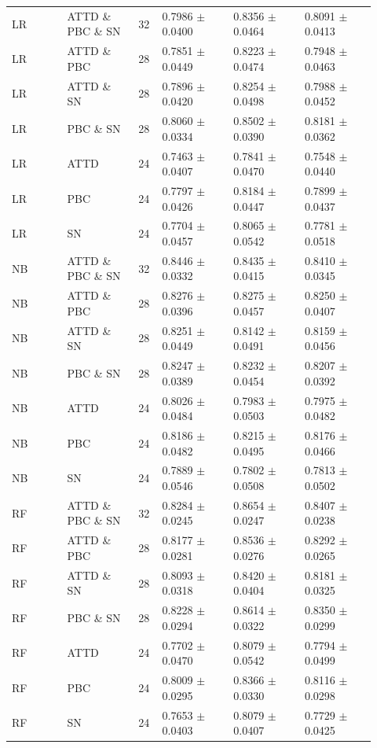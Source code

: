 \documentclass[10pt,a4paper]{article}
\newcommand{\classifiersep}{\addlinespace[1pt]\midrule\addlinespace[1pt]}
\begin{document}
\begin{landscape}
\begin{longtable}{@{}L{0.14\linewidth}L{0.18\linewidth}C{0.06\linewidth}C{0.18\linewidth}C{0.18\linewidth}C{0.18\linewidth}@{}}
LR & ATTD \& PBC \& SN & 32 & 0.7986 $\pm$ 0.0400 & 0.8356 $\pm$ 0.0464 & 0.8091 $\pm$ 0.0413 \\
LR & ATTD \& PBC & 28 & 0.7851 $\pm$ 0.0449 & 0.8223 $\pm$ 0.0474 & 0.7948 $\pm$ 0.0463 \\
LR & ATTD \& SN & 28 & 0.7896 $\pm$ 0.0420 & 0.8254 $\pm$ 0.0498 & 0.7988 $\pm$ 0.0452 \\
LR & PBC \& SN & 28 & 0.8060 $\pm$ 0.0334 & 0.8502 $\pm$ 0.0390 & 0.8181 $\pm$ 0.0362 \\
LR & ATTD & 24 & 0.7463 $\pm$ 0.0407 & 0.7841 $\pm$ 0.0470 & 0.7548 $\pm$ 0.0440 \\
LR & PBC & 24 & 0.7797 $\pm$ 0.0426 & 0.8184 $\pm$ 0.0447 & 0.7899 $\pm$ 0.0437 \\
LR & SN & 24 & 0.7704 $\pm$ 0.0457 & 0.8065 $\pm$ 0.0542 & 0.7781 $\pm$ 0.0518 \\
\classifiersep
NB & ATTD \& PBC \& SN & 32 & 0.8446 $\pm$ 0.0332 & 0.8435 $\pm$ 0.0415 & 0.8410 $\pm$ 0.0345 \\
NB & ATTD \& PBC & 28 & 0.8276 $\pm$ 0.0396 & 0.8275 $\pm$ 0.0457 & 0.8250 $\pm$ 0.0407 \\
NB & ATTD \& SN & 28 & 0.8251 $\pm$ 0.0449 & 0.8142 $\pm$ 0.0491 & 0.8159 $\pm$ 0.0456 \\
NB & PBC \& SN & 28 & 0.8247 $\pm$ 0.0389 & 0.8232 $\pm$ 0.0454 & 0.8207 $\pm$ 0.0392 \\
NB & ATTD & 24 & 0.8026 $\pm$ 0.0484 & 0.7983 $\pm$ 0.0503 & 0.7975 $\pm$ 0.0482 \\
NB & PBC & 24 & 0.8186 $\pm$ 0.0482 & 0.8215 $\pm$ 0.0495 & 0.8176 $\pm$ 0.0466 \\
NB & SN & 24 & 0.7889 $\pm$ 0.0546 & 0.7802 $\pm$ 0.0508 & 0.7813 $\pm$ 0.0502 \\
\classifiersep
RF & ATTD \& PBC \& SN & 32 & 0.8284 $\pm$ 0.0245 & 0.8654 $\pm$ 0.0247 & 0.8407 $\pm$ 0.0238 \\
RF & ATTD \& PBC & 28 & 0.8177 $\pm$ 0.0281 & 0.8536 $\pm$ 0.0276 & 0.8292 $\pm$ 0.0265 \\
RF & ATTD \& SN & 28 & 0.8093 $\pm$ 0.0318 & 0.8420 $\pm$ 0.0404 & 0.8181 $\pm$ 0.0325 \\
RF & PBC \& SN & 28 & 0.8228 $\pm$ 0.0294 & 0.8614 $\pm$ 0.0322 & 0.8350 $\pm$ 0.0299 \\
RF & ATTD & 24 & 0.7702 $\pm$ 0.0470 & 0.8079 $\pm$ 0.0542 & 0.7794 $\pm$ 0.0499 \\
RF & PBC & 24 & 0.8009 $\pm$ 0.0295 & 0.8366 $\pm$ 0.0330 & 0.8116 $\pm$ 0.0298 \\
RF & SN & 24 & 0.7653 $\pm$ 0.0403 & 0.8079 $\pm$ 0.0407 & 0.7729 $\pm$ 0.0425 \\

\end{longtable}
\end{landscape}
\end{document}
